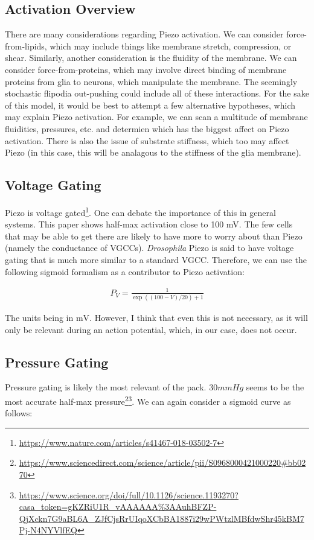 \documentclass[12pt]{amsart}
\newcommand{\pr}[1]{\left(#1\right)}
\begin{document}
\subsection{Activation Overview} There are many considerations regarding Piezo activation. We can consider force-from-lipids, which may include things like membrane stretch, compression, or shear. Similarly, another consideration is the fluidity of the membrane. We can consider force-from-proteins, which may involve direct binding of membrane proteins from glia to neurons, which manipulate the membrane. The seemingly stochastic flipodia out-pushing could include all of these interactions. For the sake of this model, it would be best to attempt a few alternative hypotheses, which may explain Piezo activation. For example, we can scan a multitude of membrane fluidities, pressures, etc. and determien which has the biggest affect on Piezo activation. There is also the issue of substrate stiffness, which too may affect Piezo (in this case, this will be analagous to the stiffness of the glia membrane).\newline 

\subsection{Voltage Gating} Piezo is voltage gated\footnote{\url{https://www.nature.com/articles/s41467-018-03502-7}}. One can debate the importance of this in general systems. This paper shows half-max activation close to 100 mV. The few cells that may be able to get there are likely to have more to worry about than Piezo (namely the conductance of VGCCs). \textit{Drosophila} Piezo is said to have voltage gating that is much more similar to a standard VGCC. Therefore, we can use the following sigmoid formalism as a contributor to Piezo activation: 

\bigskip


\begin{equation} \label{eq8}
\begin{split}
P_V = \frac{1}{\exp\pr{\pr{100 - V}/20} + 1}
\end{split}
\end{equation}

\bigskip

The units being in $\mathrm{mV}$. However, I think that even this is not necessary, as it will only be relevant during an action potential, which, in our case, does not occur. 

\subsection{Pressure Gating} Pressure gating is likely the most relevant of the pack. $30mmHg$ seems to be the most accurate half-max pressure\footnote{\url{https://www.sciencedirect.com/science/article/pii/S0968000421000220\#bb0270}}\footnote{\url{https://www.science.org/doi/full/10.1126/science.1193270?casa_token=gKZRiU1R_vAAAAAA\%3AAuhBFZP-QjXckn7G9aBL6A_ZJfCjsRrUIqoXCbBA1887i29wPWtzlMBfdwShr45kBM7Pj-N4NYVlfEQ}}. We can again consider a sigmoid curve as follows: 
\end{document}
